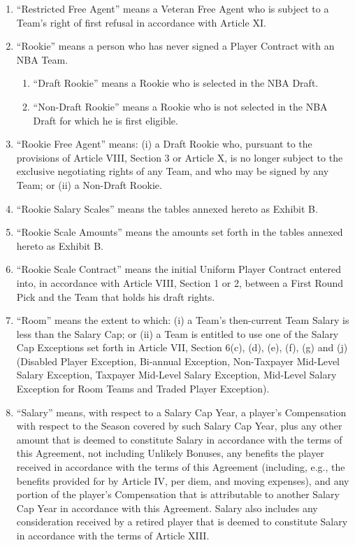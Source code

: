 \documentclass[
]{book}
\providecommand{\tightlist}{%
  \setlength{\itemsep}{0pt}\setlength{\parskip}{0pt}}
\begin{document}
\begin{enumerate}
\item
  ``Restricted Free Agent'' means a Veteran Free Agent who is subject to a Team's right of first refusal in accordance with Article XI.
\item
  ``Rookie'' means a person who has never signed a Player Contract with an NBA Team.

  \begin{enumerate}
  \def\labelenumii{(\roman{enumii})}
  \tightlist
  \item
    ``Draft Rookie'' means a Rookie who is selected in the NBA Draft.
  \item
    ``Non-Draft Rookie'' means a Rookie who is not selected in the NBA Draft for which he is first eligible.
  \end{enumerate}
\item
  ``Rookie Free Agent'' means: (i) a Draft Rookie who, pursuant to the provisions of Article VIII, Section 3 or Article X, is no longer subject to the exclusive negotiating rights of any Team, and who may be signed by any Team; or (ii) a Non-Draft Rookie.
\item
  ``Rookie Salary Scales'' means the tables annexed hereto as Exhibit B.
\item
  ``Rookie Scale Amounts'' means the amounts set forth in the tables annexed hereto as Exhibit B.
\item
  ``Rookie Scale Contract'' means the initial Uniform Player Contract entered into, in accordance with Article VIII, Section 1 or 2, between a First Round Pick and the Team that holds his draft rights.
\item
  ``Room'' means the extent to which: (i) a Team's then-current Team Salary is less than the Salary Cap; or (ii) a Team is entitled to use one of the Salary Cap Exceptions set forth in Article VII, Section 6(c), (d), (e), (f), (g) and (j) (Disabled Player Exception, Bi-annual Exception, Non-Taxpayer Mid-Level Salary Exception, Taxpayer Mid-Level Salary Exception, Mid-Level Salary Exception for Room Teams and Traded Player Exception).
\item
  ``Salary'' means, with respect to a Salary Cap Year, a player's Compensation with respect to the Season covered by such Salary Cap Year, plus any other amount that is deemed to constitute Salary in accordance with the terms of this Agreement, not including Unlikely Bonuses, any benefits the player received in accordance with the terms of this Agreement (including, e.g., the benefits provided for by Article IV, per diem, and moving expenses), and any portion of the player's Compensation that is attributable to another Salary Cap Year in accordance with this Agreement. Salary also includes any consideration received by a retired player that is deemed to constitute Salary in accordance with the terms of Article XIII.

\end{enumerate}
\end{document}
